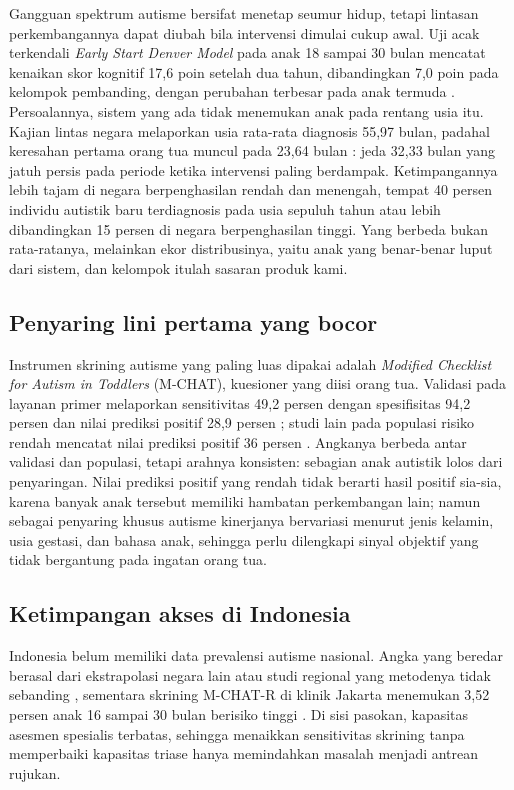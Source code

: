 \documentclass[10pt,letterpaper]{article}
\begin{document}
Gangguan spektrum autisme bersifat menetap seumur hidup, tetapi lintasan perkembangannya dapat
diubah bila intervensi dimulai cukup awal. Uji acak terkendali \textit{Early Start Denver
Model} pada anak 18 sampai 30 bulan mencatat kenaikan skor kognitif 17,6 poin setelah dua
tahun, dibandingkan 7,0 poin pada kelompok pembanding, dengan perubahan terbesar pada anak
termuda \cite{dawson2010}. Persoalannya, sistem yang ada tidak menemukan anak pada rentang
usia itu. Kajian lintas negara melaporkan usia rata-rata diagnosis 55,97 bulan, padahal
keresahan pertama orang tua muncul pada 23,64 bulan \cite{vanttila2022}: jeda 32,33 bulan yang
jatuh persis pada periode ketika intervensi paling berdampak. Ketimpangannya lebih tajam di
negara berpenghasilan rendah dan menengah, tempat 40 persen individu autistik baru
terdiagnosis pada usia sepuluh tahun atau lebih dibandingkan 15 persen di negara berpenghasilan
tinggi. Yang berbeda bukan rata-ratanya, melainkan ekor distribusinya, yaitu anak yang
benar-benar luput dari sistem, dan kelompok itulah sasaran produk kami.

\subsection{Penyaring lini pertama yang bocor}

Instrumen skrining autisme yang paling luas dipakai adalah \textit{Modified Checklist for
Autism in Toddlers} (M-CHAT), kuesioner yang diisi orang tua. Validasi pada layanan primer
melaporkan sensitivitas 49,2 persen dengan spesifisitas 94,2 persen dan nilai prediksi positif
28,9 persen \cite{mchat2026}; studi lain pada populasi risiko rendah mencatat nilai prediksi
positif 36 persen \cite{sturner2017}. Angkanya berbeda antar validasi dan populasi, tetapi
arahnya konsisten: sebagian anak autistik lolos dari penyaringan. Nilai prediksi positif yang
rendah tidak berarti hasil positif sia-sia, karena banyak anak tersebut memiliki hambatan
perkembangan lain; namun sebagai penyaring khusus autisme kinerjanya bervariasi menurut jenis
kelamin, usia gestasi, dan bahasa anak, sehingga perlu dilengkapi sinyal objektif yang tidak
bergantung pada ingatan orang tua.

\subsection{Ketimpangan akses di Indonesia}

Indonesia belum memiliki data prevalensi autisme nasional. Angka yang beredar berasal dari
ekstrapolasi negara lain atau studi regional yang metodenya tidak sebanding \cite{pontianak2019},
sementara skrining M-CHAT-R di klinik Jakarta menemukan 3,52 persen anak 16 sampai 30 bulan
berisiko tinggi \cite{paediatrica2020}. Di sisi pasokan, kapasitas asesmen spesialis terbatas,
sehingga menaikkan sensitivitas skrining tanpa memperbaiki kapasitas triase hanya memindahkan
masalah menjadi antrean rujukan.
\end{document}
